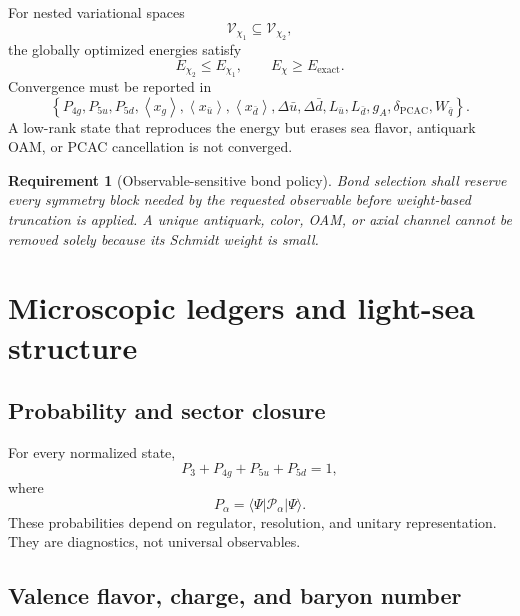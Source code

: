 \documentclass[11pt]{article}
\newtheorem{requirement}[definition]{Requirement}
\newcommand{\cV}{\mathcal V}
\newcommand{\cP}{\mathcal P}
\newcommand{\avg}[1]{\left\langle #1\right\rangle}
\begin{document}
For nested variational spaces
\begin{equation}
 \cV_{\chi_1}\subseteq\cV_{\chi_2},
\end{equation}
the globally optimized energies satisfy
\begin{equation}
 E_{\chi_2}\le E_{\chi_1},
 \qquad
 E_{\chi}\ge E_{\mathrm{exact}}.
\end{equation}
Convergence must be reported in
\begin{equation}
 \left
 \{
 P_{4g},P_{5u},P_{5d},
 \avg{x_g},\avg{x_{\bar u}},\avg{x_{\bar d}},
 \Delta\bar u,\Delta\bar d,
 L_{\bar u},L_{\bar d},
 g_A,\delta_{\mathrm{PCAC}},
 W_{\bar q}
 \right
 \}.
\end{equation}
A low-rank state that reproduces the energy but erases sea flavor, antiquark
OAM, or PCAC cancellation is not converged.

\begin{requirement}[Observable-sensitive bond policy]
Bond selection shall reserve every symmetry block needed by the requested
observable before weight-based truncation is applied.  A unique antiquark,
color, OAM, or axial channel cannot be removed solely because its Schmidt
weight is small.
\end{requirement}

\section{Microscopic ledgers and light-sea structure}
\label{sec:ledgers}

\subsection{Probability and sector closure}

For every normalized state,
\begin{equation}
 P_3+P_{4g}+P_{5u}+P_{5d}=1,
 \label{eq:probability-ledger}
\end{equation}
where
\begin{equation}
 P_{\alpha}
 =\langle\Psi|\cP_{\alpha}|\Psi\rangle.
\end{equation}
These probabilities depend on regulator, resolution, and unitary
representation.  They are diagnostics, not universal observables.

\subsection{Valence flavor, charge, and baryon number}
\end{document}
